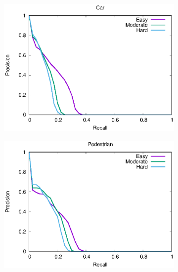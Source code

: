 \begin{figure}[H]
\begin{subfigure}{.5\textwidth}
    \centering
    \includegraphics[width=1.0\linewidth]{img/yolo_Nov_4/plot_valid/car_detection.eps}
\end{subfigure}%
\begin{subfigure}{.5\textwidth}
    \centering
    \includegraphics[width=1.0\linewidth]{img/yolo_Nov_4/plot_valid/pedestrian_detection.eps}
\end{subfigure}
\caption{Using a Pre-Trained Yolo Model}
\begin{subfigure}{.5\textwidth}
    \centering

\end{subfigure}
\end{figure}
